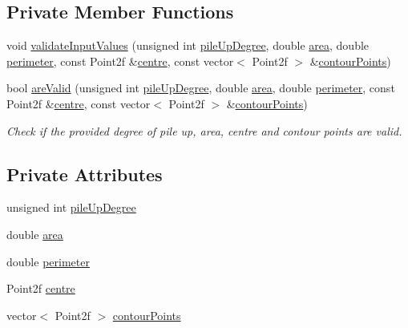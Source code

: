 \subsection*{Private Member Functions}
\begin{DoxyCompactItemize}
\item 
void \hyperlink{classmultiscale_1_1analysis_1_1Entity_afd09bf78874eb411c0940713948c4891}{validate\-Input\-Values} (unsigned int \hyperlink{classmultiscale_1_1analysis_1_1Entity_aae78866cef9fcb7bd2e858570f47d082}{pile\-Up\-Degree}, double \hyperlink{classmultiscale_1_1analysis_1_1Entity_a7fad3c67bb46cc0f4ce1fb17ef3e66cc}{area}, double \hyperlink{classmultiscale_1_1analysis_1_1Entity_ac7bcdb1cb5eb4369ca8e44d3dbda44a3}{perimeter}, const Point2f \&\hyperlink{classmultiscale_1_1analysis_1_1Entity_ad226609174b21f71210161d29a16d4ef}{centre}, const vector$<$ Point2f $>$ \&\hyperlink{classmultiscale_1_1analysis_1_1Entity_a0199b0a0e5b22809015ecbc23d17785e}{contour\-Points})
\item 
bool \hyperlink{classmultiscale_1_1analysis_1_1Entity_a8b38c81f4b86df13ab640f8d3bac5cbc}{are\-Valid} (unsigned int \hyperlink{classmultiscale_1_1analysis_1_1Entity_aae78866cef9fcb7bd2e858570f47d082}{pile\-Up\-Degree}, double \hyperlink{classmultiscale_1_1analysis_1_1Entity_a7fad3c67bb46cc0f4ce1fb17ef3e66cc}{area}, double \hyperlink{classmultiscale_1_1analysis_1_1Entity_ac7bcdb1cb5eb4369ca8e44d3dbda44a3}{perimeter}, const Point2f \&\hyperlink{classmultiscale_1_1analysis_1_1Entity_ad226609174b21f71210161d29a16d4ef}{centre}, const vector$<$ Point2f $>$ \&\hyperlink{classmultiscale_1_1analysis_1_1Entity_a0199b0a0e5b22809015ecbc23d17785e}{contour\-Points})
\begin{DoxyCompactList}\small\item\em Check if the provided degree of pile up, area, centre and contour points are valid. \end{DoxyCompactList}\end{DoxyCompactItemize}
\subsection*{Private Attributes}
\begin{DoxyCompactItemize}
\item 
unsigned int \hyperlink{classmultiscale_1_1analysis_1_1Entity_aae78866cef9fcb7bd2e858570f47d082}{pile\-Up\-Degree}
\item 
double \hyperlink{classmultiscale_1_1analysis_1_1Entity_a7fad3c67bb46cc0f4ce1fb17ef3e66cc}{area}
\item 
double \hyperlink{classmultiscale_1_1analysis_1_1Entity_ac7bcdb1cb5eb4369ca8e44d3dbda44a3}{perimeter}
\item 
Point2f \hyperlink{classmultiscale_1_1analysis_1_1Entity_ad226609174b21f71210161d29a16d4ef}{centre}
\item 
vector$<$ Point2f $>$ \hyperlink{classmultiscale_1_1analysis_1_1Entity_a0199b0a0e5b22809015ecbc23d17785e}{contour\-Points}
\end{DoxyCompactItemize}



